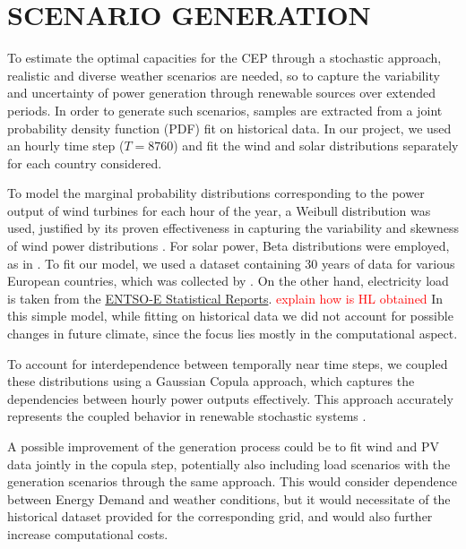 \newpage
\color{black}

\appendix

\section{SCENARIO GENERATION}\label{generation}

To estimate the optimal capacities for the CEP through a stochastic approach, realistic and diverse weather scenarios are needed, so to capture the variability and uncertainty of power generation through renewable sources over extended periods. 
In order to generate such scenarios, samples are extracted from a joint probability density function (PDF) fit on historical data. 
In our project, we used an hourly time step ($T=8760$) and fit the wind and solar distributions separately for each country considered.

To model the marginal probability distributions corresponding to the power output of wind turbines for each hour of the year, a Weibull distribution was used, justified by its proven effectiveness in capturing the variability and skewness of wind power distributions \textcolor{green}{\cite{weibullwind}}. 
For solar power, Beta distributions were employed, as in \textcolor{green}{\cite{betaPV}}.
To fit our model, we used a dataset containing 30 years of data for various European countries, which was collected by \textcolor{green}{\cite{30y_gen}}. 
On the other hand, electricity load is taken from the \textcolor{green}{\href{https://www.entsoe.eu/data/power-stats/}{ENTSO-E Statistical Reports}}. \textcolor{red}{explain how is HL obtained}
In this simple model, while fitting on historical data we did not account for possible changes in future climate, since the focus lies mostly in the computational aspect.

To account for interdependence between temporally near time steps, we coupled these distributions using a Gaussian Copula approach, which captures the dependencies between hourly power outputs effectively. 
This approach accurately represents the coupled behavior in renewable stochastic systems \textcolor{green}{\cite{GaussCopula}}. 

A possible improvement of the generation process could be to fit wind and PV data jointly in the copula step, potentially also including load scenarios with the generation scenarios through the same approach. 
This would consider dependence between Energy Demand and weather conditions, but it would necessitate of the historical dataset provided for the corresponding grid, and would also further increase computational costs.

